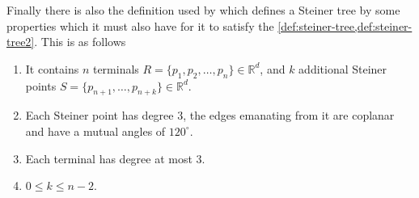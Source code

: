 Finally there is also the definition used by \textcite{smith1992} which defines
a Steiner tree by some properties which it must also have for it to satisfy the
\cref{def:steiner-tree,def:steiner-tree2}. This is as follows
%
\begin{definition}
  \leavevmode\vspace{-\baselineskip}\par
  \begin{enumerate}
  \item It contains $n$ terminals
    $R = \{ p_1, p_2, \ldots, p_n \} \in \mathbb{R}^d$, and $k$
    additional Steiner points
    $S = \{ p_{n+1}, \ldots, p_{n+k} \} \in \mathbb{R}^d$.
  \item Each Steiner point has degree $3$, the edges emanating from it are
    coplanar and have a mutual angles of $120^{\circ}$.
  \item Each terminal has degree at most $3$.
  \item $0 \le k \le n-2$.
  \end{enumerate}
\end{definition}
%
